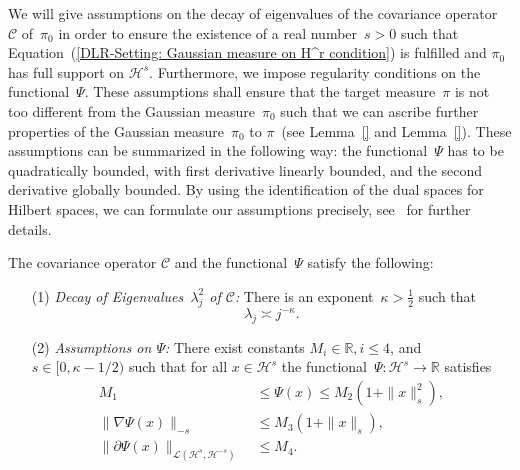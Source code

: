 We will give assumptions on the decay of eigenvalues of the covariance operator~$\mathcal{C}$ of~$\pi_0$ in order to ensure the existence of a real number~$s > 0$ such that Equation~(\ref{DLR-Setting: Gaussian measure on H^r condition}) is fulfilled and $\pi_0$ has full support on $\mathcal{H}^s$. Furthermore, we impose regularity conditions on the functional~$\Psi$. These assumptions shall ensure that the target measure~$\pi$ is not too different from the Gaussian measure~$\pi_0$ such that we can ascribe further properties of the Gaussian measure~$\pi_0$ to $\pi$~(see Lemma~\ref{} and Lemma~\ref{}). These assumptions can be summarized in the following way: the functional~$\Psi$ has to be quadratically bounded, with first derivative linearly bounded, and the second derivative globally bounded. By using the identification of the dual spaces for Hilbert spaces, we can formulate our assumptions precisely, see~\autocite[Assumption 2.1]{Pillai2012} for further details.

\begin{assum}
 \label{DLR-Setting: Assumptions on C and Psi}
 The covariance operator $\mathcal{C}$ and the functional~$\Psi$ satisfy the following:
 \begin{enumerate} 
  \item[(1)] \textit{Decay of Eigenvalues~$\lambda_j^2$ of $\mathcal{C}$: } There is an exponent~$\kappa > \tfrac{1}{2}$ such that
 \begin{equation}
  \lambda_j \asymp j^{- \kappa}.
 \end{equation}
 \item[(2)] \textit{Assumptions on $\Psi$: } There exist constants $M_i \in \mathbb{R}, i \leq 4$, and $s \in [0, \kappa - 1/2)$ such that for all $x \in \mathcal{H}^s$ the functional~$\Psi: \mathcal{H}^s \to \mathbb{R}$ satisfies
 \begin{align}
  M_1 & \; \leq \Psi(x) \leq M_2 (1+ \| x \|_s^2), \\
  \| \nabla \Psi (x) \|_{-s} & \; \leq M_3 (1+\| x\|_s), \\
  \| \partial \Psi (x) \|_{\mathcal{L}(\mathcal{H}^s, \mathcal{H}^{-s})} & \; \leq M_4.
 \end{align}
 \end{enumerate}
\end{assum}



